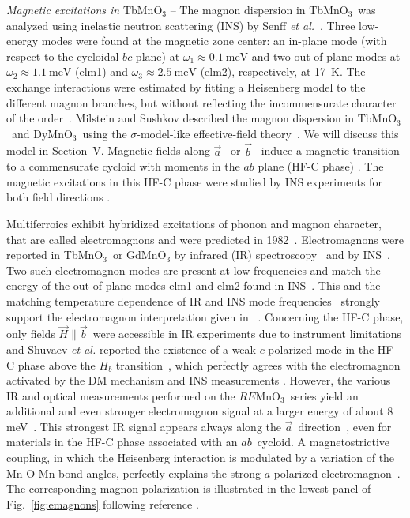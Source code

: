 \documentclass[aps,prb,twocolumn,superscriptaddress,showpacs,floatfix]{revtex4-2}
\newcommand{\tbmno}{TbMnO$_3$}
\newcommand{\aaxis}{$\vec{a}$}
\newcommand{\baxis}{$\vec{b}$}
\newcommand{\abplane}{$ab$}
\newcommand{\etal}{\textit{et al.}}
\newcommand{\REmno}{$RE$MnO$_3$}
\newcommand{\dymno}{DyMnO$_3$}
\newcommand{\Hparab}{$\vec{H}\parallel\vec{b}$}
\begin{document}
{\it Magnetic excitations  in} TbMnO$_3$ -- The magnon dispersion in \tbmno \ was analyzed using inelastic neutron scattering (INS) by Senff \etal~\cite{Senff2007,Senff2008a}. Three low-energy modes were found at the magnetic zone center: an in-plane mode (with respect to the cycloidal $bc$ plane)  at $\omega_1\approx\SI{0.1}{\milli\eV}$ and two out-of-plane modes at $\omega_2\approx\SI{1.1}{\milli\eV}$ (elm1) and $\omega_3\approx\SI{2.5}{\milli\eV}$ (elm2), respectively, at \SI{17}{\kelvin}. The exchange interactions were estimated by fitting a Heisenberg model to the different magnon branches, but without reflecting the incommensurate character of the order~\cite{Senff2007,Senff2008a}. Milstein and Sushkov described the magnon dispersion in \tbmno\ and \dymno\ using the $\sigma$-model-like effective-field theory~\cite{Milstein2015}. We will discuss this model in Section~V. Magnetic fields along \aaxis ~ or \baxis ~ induce a magnetic transition to a commensurate cycloid with moments in the $ab$ plane (HF-C phase) \cite{Kimura2004,Aliouane2009}. The magnetic excitations in this HF-C phase were studied by INS experiments for both field directions \cite{Senff2008,Holbein2015}.

Multiferroics exhibit hybridized excitations of phonon and magnon character, that are called electromagnons and were predicted in 1982~\cite{Smolenskii1982}. Electromagnons were reported in \tbmno\ or GdMnO$_3$ by infrared (IR) spectroscopy~\cite{Pimenov2006} and by INS~\cite{Senff2007}.
Two such electromagnon modes are present at low frequencies and match the energy of the out-of-plane modes elm1 and elm2 found in INS~\cite{Pimenov2006,Pimenov2009,Senff2007}.
This and the matching temperature dependence of IR and INS mode frequencies~\cite{Shuvaev2011,Holbein2015} strongly support the electromagnon interpretation given in ~\cite{Katsura2007}. Concerning the HF-C phase, only fields \Hparab\ were accessible in IR experiments due to instrument limitations and Shuvaev \textit{et al.} reported the existence of a weak $c$-polarized mode in the HF-C phase above the $H_b$ transition~\cite{Shuvaev2010}, which perfectly agrees with the electromagnon activated by the DM mechanism and INS
measurements \cite{Holbein2015}.
However, the various IR and optical measurements performed on the \REmno\ series yield an additional and even stronger electromagnon signal at a larger energy of about 8\,meV~\cite{ValdesAguilar2009,Mochizuki2011b,Rovillain2011,Finger2014}. This strongest IR signal appears always along the \aaxis\ direction~\cite{Pimenov2009}, even for materials in the HF-C phase associated with an \abplane\ cycloid. A magnetostrictive coupling, in which the Heisenberg interaction is modulated by a variation of the Mn-O-Mn bond angles, perfectly explains the strong $a$-polarized electromagnon~\cite{ValdesAguilar2009}. The corresponding magnon polarization is illustrated in the lowest panel of Fig.~\ref{fig:emagnons} following reference .
\end{document}
